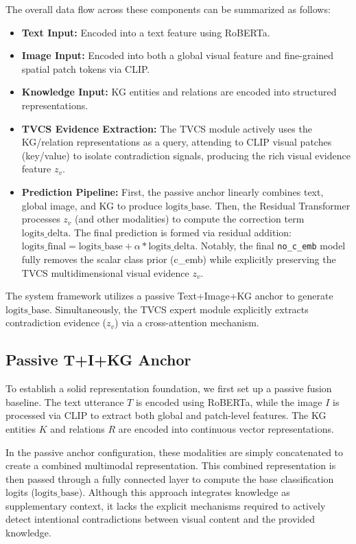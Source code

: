 The overall data flow across these components can be summarized as follows:
\begin{itemize}
    \item \textbf{Text Input:} Encoded into a text feature using RoBERTa.
    \item \textbf{Image Input:} Encoded into both a global visual feature and fine-grained spatial patch tokens via CLIP.
    \item \textbf{Knowledge Input:} KG entities and relations are encoded into structured representations.
    \item \textbf{TVCS Evidence Extraction:} The TVCS module actively uses the KG/relation representations as a query, attending to CLIP visual patches (key/value) to isolate contradiction signals, producing the rich visual evidence feature $z_v$.
    \item \textbf{Prediction Pipeline:} First, the passive anchor linearly combines text, global image, and KG to produce $\text{logits\_base}$. Then, the Residual Transformer processes $z_v$ (and other modalities) to compute the correction term $\text{logits\_delta}$. The final prediction is formed via residual addition: $\text{logits\_final} = \text{logits\_base} + \alpha * \text{logits\_delta}$. Notably, the final \texttt{no\_c\_emb} model fully removes the scalar class prior (c\_emb) while explicitly preserving the TVCS multidimensional visual evidence $z_v$.
\end{itemize}

The system framework utilizes a passive Text+Image+KG anchor to generate $\text{logits\_base}$. Simultaneously, the TVCS expert module explicitly extracts contradiction evidence ($z_v$) via a cross-attention mechanism.

\subsection{Passive T+I+KG Anchor}
To establish a solid representation foundation, we first set up a passive fusion baseline. The text utterance $T$ is encoded using RoBERTa, while the image $I$ is processed via CLIP to extract both global and patch-level features. The KG entities $K$ and relations $R$ are encoded into continuous vector representations.

In the passive anchor configuration, these modalities are simply concatenated to create a combined multimodal representation. This combined representation is then passed through a fully connected layer to compute the base classification logits ($\text{logits\_base}$). Although this approach integrates knowledge as supplementary context, it lacks the explicit mechanisms required to actively detect intentional contradictions between visual content and the provided knowledge.

